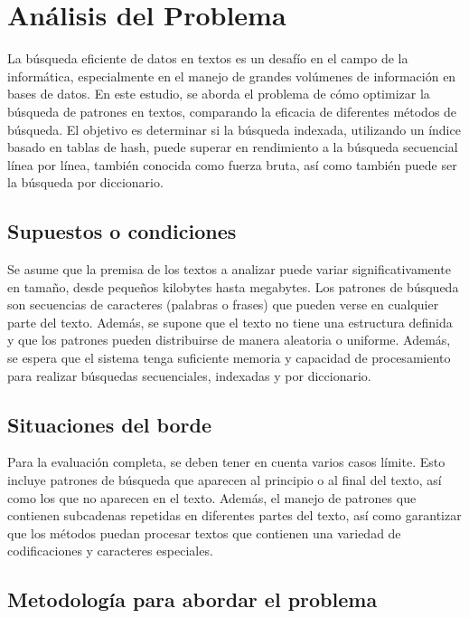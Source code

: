 \documentclass[12pt, twoside]{article}
\begin{document}
\section{Análisis del Problema}
La búsqueda eficiente de datos en textos es un desafío en el campo de la informática, especialmente en el manejo de grandes volúmenes de información en bases de datos. En este estudio, se aborda el problema de cómo optimizar la búsqueda de patrones en textos, comparando la eficacia de diferentes métodos de búsqueda. El objetivo es determinar si la búsqueda indexada, utilizando un índice basado en tablas de hash, puede superar en rendimiento a la búsqueda secuencial línea por línea, también conocida como fuerza bruta, así como también puede ser la búsqueda por diccionario.

\subsection{Supuestos o condiciones}
Se asume que la premisa de los textos a analizar puede variar significativamente en tamaño, desde pequeños kilobytes hasta megabytes. Los patrones de búsqueda son secuencias de caracteres (palabras o frases) que pueden verse en cualquier parte del texto. Además, se supone que el texto no tiene una estructura definida y que los patrones pueden distribuirse de manera aleatoria o uniforme. Además, se espera que el sistema tenga suficiente memoria y capacidad de procesamiento para realizar búsquedas secuenciales, indexadas y por diccionario.

\subsection{Situaciones del borde}
Para la evaluación completa, se deben tener en cuenta varios casos límite. Esto incluye patrones de búsqueda que aparecen al principio o al final del texto, así como los que no aparecen en el texto. Además, el manejo de patrones que contienen subcadenas repetidas en diferentes partes del texto, así como garantizar que los métodos puedan procesar textos que contienen una variedad de codificaciones y caracteres especiales.

\subsection{Metodología para abordar el problema}
\end{document}
